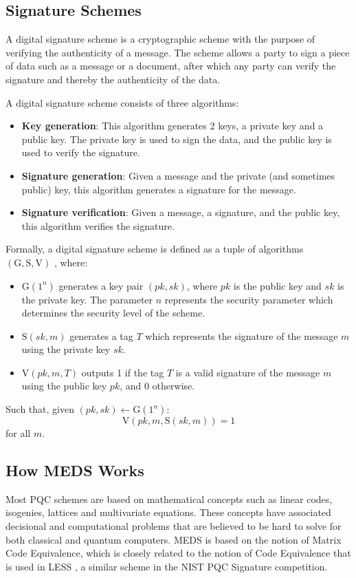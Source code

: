\documentclass[11pt,a4paper]{report}
\theoremstyle{definition}
\begin{document}
\subsection{Signature Schemes}
\label{sec:signatureschemes}
A digital signature scheme is a cryptographic scheme with the purpose of verifying the authenticity of a message. The scheme allows a party to sign a piece of data such as a message or a document, after which any party can verify the signature and thereby the authenticity of the data.

A digital signature scheme consists of three algorithms:
\begin{itemize}
  \item \textbf{Key generation}: This algorithm generates 2 keys, a private key and a public key. The private key is used to sign the data, and the public key is used to verify the signature.
  \item \textbf{Signature generation}: Given a message and the private (and sometimes public) key, this algorithm generates a signature for the message.
  \item \textbf{Signature verification}: Given a message, a signature, and the public key, this algorithm verifies the signature.
\end{itemize}

Formally, a digital signature scheme is defined as a tuple of algorithms $(\text{G}, \text{S}, \text{V})$ \cite{goldwasser2008lecture}, where:
\begin{itemize}
  \item $\text{G}(1^n)$ generates a key pair $(pk, sk)$, where $pk$ is the public key and $sk$ is the private key. The parameter $n$ represents the security parameter which determines the security level of the scheme.
  \item $\text{S}(sk, m)$ generates a tag $T$ which represents the signature of the message $m$ using the private key $sk$.
  \item $\text{V}(pk, m, T)$ outputs 1 if the tag $T$ is a valid signature of the message $m$ using the public key $pk$, and 0 otherwise.
\end{itemize}
Such that, given $(pk, sk) \leftarrow \text{G}(1^n)$:
\[
  \text{V}(pk, m, \text{S}(sk, m)) = 1
\]
for all $m$.

\subsection{How MEDS Works}
\label{sec:medsworks}
Most PQC schemes are based on mathematical concepts such as linear codes, isogenies, lattices and multivariate equations. These concepts have associated decisional and computational problems that are believed to be hard to solve for both classical and quantum computers. MEDS is based on the notion of Matrix Code Equivalence, which is closely related to the notion of Code Equivalence that is used in LESS \cite{biasse2020less}, a similar scheme in the NIST PQC Signature competition.
\end{document}
